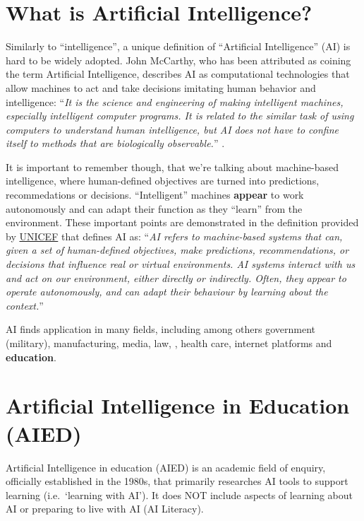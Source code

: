\documentclass[
]{book}
\begin{document}
\section{What is Artificial Intelligence?}\label{what-is-artificial-intelligence}

Similarly to ``intelligence'', a unique definition of ``Artificial Intelligence'' (AI) is hard to be widely adopted.
John McCarthy, who has been attributed as coining the term Artificial Intelligence, describes AI as computational technologies that allow machines to act and take decisions imitating human behavior and intelligence: ``\emph{It is the science and engineering of making intelligent machines, especially intelligent computer programs. It is related to the similar task of using computers to understand human intelligence, but AI does not have to
confine itself to methods that are biologically observable.}'' \citep{mccarthy2007artificial}.

It is important to remember though, that we're talking about machine-based intelligence, where human-defined objectives are turned into predictions, recommedations or decisions. ``Intelligent'' machines \textbf{appear} to work autonomously and can adapt their function as they ``learn'' from the environment. These important points are demonstrated in the definition provided by \href{https://www.unicef.org/globalinsight/media/2356/file/UNICEF-Global-Insight-policy-guidance-AI-children-2.0-2021.pdf}{UNICEF} that defines AI as: ``\emph{AI refers to machine-based systems that can, given a set of human-defined objectives, make predictions, recommendations, or decisions that influence real or virtual environments. AI systems interact with us and act on our environment, either directly or indirectly. Often, they appear to operate autonomously, and can adapt their behaviour by learning about the context.}''

AI finds application in many fields, including among others government (military), manufacturing, media, law, , health care, internet platforms and \textbf{education}.

\section{Artificial Intelligence in Education (AIED)}\label{artificial-intelligence-in-education-aied}

Artificial Intelligence in education (AIED) is an academic field of enquiry, officially established in the 1980s, that primarily researches AI tools to support learning (i.e.~`learning with AI'). It does NOT include aspects of learning about AI or preparing to live with AI (AI Literacy).
\end{document}
